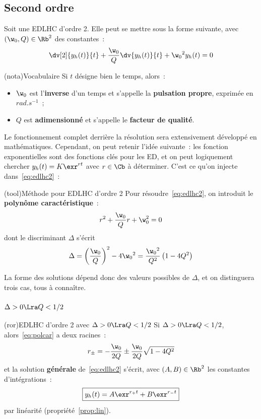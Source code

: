 \documentclass[a4paper, 12pt, garamond]{book}
\begin{document}
\subsection{Second ordre}
Soit une EDLHC d'ordre 2. Elle peut se mettre sous la forme suivante, avec
$(\w_0,Q) \in \Rb^{2}$ des constantes~:
\begin{equation}
	\dv[2]{y_h(t)}{t} + \frac{\w_0}{Q}\dv{y_h(t)}{t} + \w_0{}^{2} y_h(t) = 0
	\label{eq:edlhc2}
\end{equation}
\begin{tcb}(nota){Vocabulaire}
	Si $t$ désigne bien le temps, alors~:
	\begin{itemize}
		\item $\w_0$ est l'\textbf{inverse} d'un temps et s'appelle la
		      \textbf{pulsation propre}, exprimée en $\si{rad.s^{-1}}$~;
		\item $Q$ est \textbf{adimensionné} et s'appelle le \textbf{facteur de
			      qualité}.
	\end{itemize}
\end{tcb}
Le fonctionnement complet derrière la résolution sera extensivement développé en
mathématiques. Cependant, on peut retenir l'idée suivante~: les fonction
exponentielles sont des fonctions clés pour les ED, et on peut logiquement
chercher $y_h(t) = K\exr^{rt}$ avec $r \in \Cb$ à déterminer. C'est ce qu'on
injecte dans~\eqref{eq:edlhc2}~:
\begin{tcb}(tool){Méthode pour EDLHC d'ordre 2}
	Pour résoudre~\eqref{eq:edlhc2}, on introduit le \textbf{polynôme
		caractéristique}~:
	\begin{equation}
		r^{2} + \frac{\w_0}{Q}r + \w_0^{2} = 0
		\label{eq:polcar}
	\end{equation}
	dont le discriminant $\Delta$ s'écrit
	\[
		\Delta =
		\left( \frac{\w_0}{Q} \right)^{2} - 4\w_0{}^{2} =
		\frac{\w_0{}^{2}}{Q^{2}} \left( 1 -4Q^{2} \right)
	\]
\end{tcb}
La forme des solutions dépend donc des valeurs possibles de $\Delta$, et on
distinguera trois cas, tous à connaître.

\subsubsection{$\Delta > 0 \Lra Q <1/2$}
\begin{tcb}(ror){EDLHC d'ordre 2 avec $\Delta > 0 \Lra Q <1/2$}
	Si $\Delta > 0 \Lra Q < 1/2$, alors~\eqref{eq:polcar} a deux racines~:
	\[
		r_{\pm} = -\frac{\w_0}{2Q} \pm \frac{\w_0}{2Q} \sqrt{1-4Q^{2}}
	\]
	et la solution \textbf{générale} de~\eqref{eq:edlhc2} s'écrit, avec $(A,B) \in
		\Rb^{2}$ les constantes d'intégrations~:
	\[
		\boxed{y_h(t) = A\exr^{r_+t} + B\exr^{r_-t}}
	\]
	par linéarité (propriété~\ref{prop:lin}).
\end{tcb}
\end{document}
